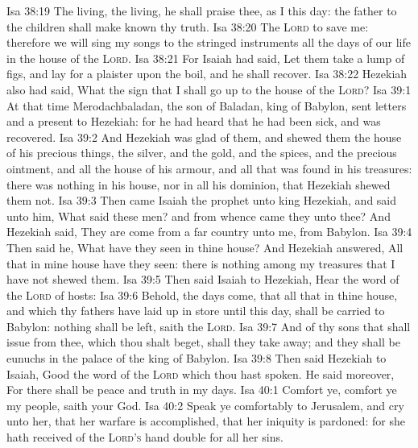 \vs Isa 38:19 The living, the living, he shall praise thee, as I  this day: the father to the children shall make known thy truth.
\vs Isa 38:20 The \textsc{Lord}  to save me: therefore we will sing my songs to the stringed instruments all the days of our life in the house of the \textsc{Lord}.
\vs Isa 38:21 For Isaiah had said, Let them take a lump of figs, and lay  for a plaister upon the boil, and he shall recover.
\vs Isa 38:22 Hezekiah also had said, What  the sign that I shall go up to the house of the \textsc{Lord}?
\vs Isa 39:1 At that time Merodachbaladan, the son of Baladan, king of Babylon, sent letters and a present to Hezekiah: for he had heard that he had been sick, and was recovered.
\vs Isa 39:2 And Hezekiah was glad of them, and shewed them the house of his precious things, the silver, and the gold, and the spices, and the precious ointment, and all the house of his armour, and all that was found in his treasures: there was nothing in his house, nor in all his dominion, that Hezekiah shewed them not.
\vs Isa 39:3 Then came Isaiah the prophet unto king Hezekiah, and said unto him, What said these men? and from whence came they unto thee? And Hezekiah said, They are come from a far country unto me,  from Babylon.
\vs Isa 39:4 Then said he, What have they seen in thine house? And Hezekiah answered, All that  in mine house have they seen: there is nothing among my treasures that I have not shewed them.
\vs Isa 39:5 Then said Isaiah to Hezekiah, Hear the word of the \textsc{Lord} of hosts:
\vs Isa 39:6 Behold, the days come, that all that  in thine house, and  which thy fathers have laid up in store until this day, shall be carried to Babylon: nothing shall be left, saith the \textsc{Lord}.
\vs Isa 39:7 And of thy sons that shall issue from thee, which thou shalt beget, shall they take away; and they shall be eunuchs in the palace of the king of Babylon.
\vs Isa 39:8 Then said Hezekiah to Isaiah, Good  the word of the \textsc{Lord} which thou hast spoken. He said moreover, For there shall be peace and truth in my days.
\vs Isa 40:1 Comfort ye, comfort ye my people, saith your God.
\vs Isa 40:2 Speak ye comfortably to Jerusalem, and cry unto her, that her warfare is accomplished, that her iniquity is pardoned: for she hath received of the \textsc{Lord's} hand double for all her sins.

